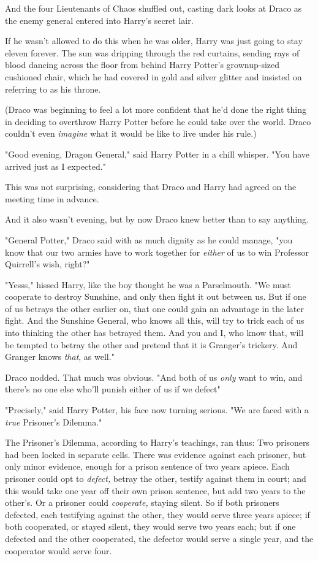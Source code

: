 And the four Lieutenants of Chaos shuffled out, casting dark looks at Draco as
the enemy general entered into Harry's secret lair.

If he wasn't allowed to do this when he was older, Harry was just going to stay
eleven forever.
\sbreak
The sun was dripping through the red curtains, sending rays of blood dancing
across the floor from behind Harry Potter's grownup-sized cushioned chair,
which he had covered in gold and silver glitter and insisted on referring to as
his throne.

(Draco was beginning to feel a lot more confident that he'd done the right
thing in deciding to overthrow Harry Potter before he could take over the
world. Draco couldn't even \emph{imagine} what it would be like to live under
his rule.)

"Good evening, Dragon General," said Harry Potter in a chill whisper. "You have
arrived just as I expected."

This was not surprising, considering that Draco and Harry had agreed on the
meeting time in advance.

And it also wasn't evening, but by now Draco knew better than to say anything.

"General Potter," Draco said with as much dignity as he could manage, "you know
that our two armies have to work together for \emph{either} of us to win
Professor Quirrell's wish, right?"

"Yesss," hissed Harry, like the boy thought he was a Parselmouth. "We must
cooperate to destroy Sunshine, and only then fight it out between us. But if
one of us betrays the other earlier on, that one could gain an advantage in the
later fight. And the Sunshine General, who knows all this, will try to trick
each of us into thinking the other has betrayed them. And you and I, who know
that, will be tempted to betray the other and pretend that it is Granger's
trickery. And Granger knows \emph{that}, as well."

Draco nodded. That much was obvious. "And{\el} both of us \emph{only} want
to win, and there's no one else who'll punish either of us if we defect{\el}"

"Precisely," said Harry Potter, his face now turning serious. "We are faced
with a \emph{true} Prisoner's Dilemma."

The Prisoner's Dilemma, according to Harry's teachings, ran thus: Two prisoners
had been locked in separate cells. There was evidence against each prisoner,
but only minor evidence, enough for a prison sentence of two years apiece. Each
prisoner could opt to \emph{defect,} betray the other, testify against them in
court; and this would take one year off their own prison sentence, but add two
years to the other's. Or a prisoner could \emph{cooperate,} staying silent. So
if both prisoners defected, each testifying against the other, they would serve
three years apiece; if both cooperated, or stayed silent, they would serve two
years each; but if one defected and the other cooperated, the defector would
serve a single year, and the cooperator would serve four.

